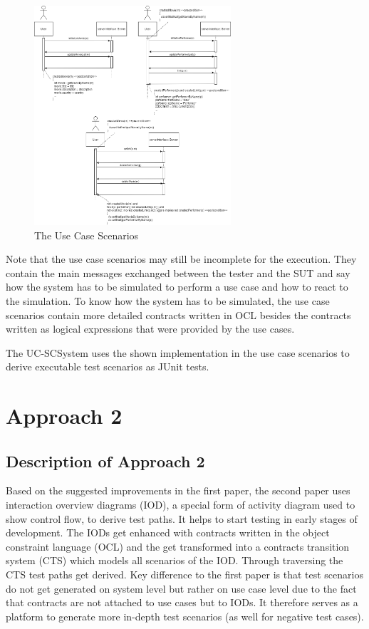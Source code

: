 \begin{figure}[h]
	\centering
	\includegraphics[width=0.65\textwidth]{./images/ucs.png}
	\caption{The Use Case Scenarios}
	\label{ucs}
\end{figure}

Note that the use case scenarios may still be incomplete for the execution. They contain the main messages exchanged between the tester and the SUT and say how the system has to be simulated to perform a use case and how to react to the simulation. To know how the system has to be simulated, the use case scenarios contain more detailed contracts written in OCL besides the contracts written as logical expressions that were provided by the use cases. 

The UC-SCSystem uses the shown implementation in the use case scenarios to derive executable test scenarios as JUnit tests.

\section{Approach 2} \label{approachtwo}

\subsection{Description of Approach 2}

Based on the suggested improvements in the first paper, the second paper uses interaction overview diagrams (IOD), a special form of activity diagram used to show control flow, to derive test paths. It helps to start testing in early stages of development. The IODs get enhanced with contracts written in the object constraint language (OCL) and the get transformed into a contracts transition system (CTS) which models all scenarios of the IOD. Through traversing the CTS test paths get derived. Key difference to the first paper is that test scenarios do not get generated on system level but rather on use case level due to the fact that contracts are not attached to use cases but to IODs. It therefore serves as a platform to generate more in-depth test scenarios (as well for negative test cases).

